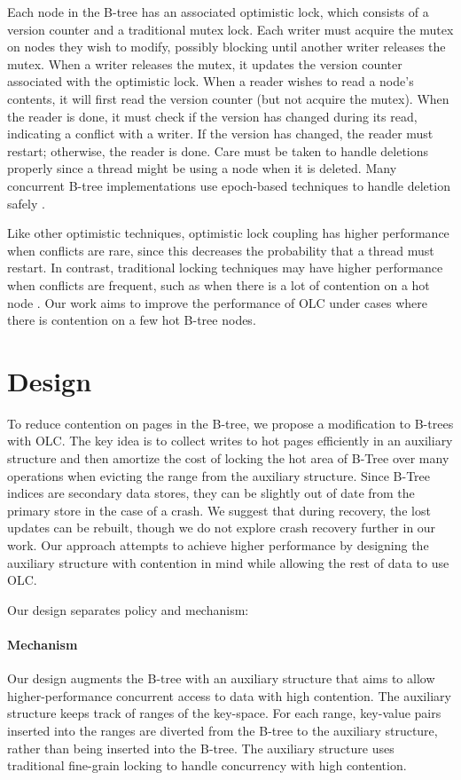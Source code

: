 \documentclass[twocolumn]{article}
\begin{document}
Each node in the B-tree has an associated optimistic lock, which consists of a
version counter and a traditional mutex lock. Each writer must acquire the
mutex on nodes they wish to modify, possibly blocking until another writer
releases the mutex. When a writer releases the mutex, it updates the version
counter associated with the optimistic lock. When a reader wishes to read a
node’s contents, it will first read the version counter (but not acquire the
mutex). When the reader is done, it must check if the version has changed
during its read, indicating a conflict with a writer. If the version has
changed, the reader must restart; otherwise, the reader is done. Care must be
taken to handle deletions properly since a thread might be using a node when it
is deleted. Many concurrent B-tree implementations use epoch-based techniques
to handle deletion safely \cite{bwtree, art}.

Like other optimistic techniques, optimistic lock coupling has higher
performance when conflicts are rare, since this decreases the probability that
a thread must restart. In contrast, traditional locking techniques may have
higher performance when conflicts are frequent, such as when there is a lot of
contention on a hot node \cite{occ}. Our work aims to improve the performance of OLC
under cases where there is contention on a few hot B-tree nodes.

\section{Design}

To reduce contention on pages in the B-tree, we propose a modification to
B-trees with OLC. The key idea is to collect writes to hot pages efficiently in
an auxiliary structure and then amortize the cost of locking the hot area of
B-Tree over many operations when evicting the range from the auxiliary
structure. Since B-Tree indices are secondary data stores, they can be slightly
out of date from the primary store in the case of a crash. We suggest that
during recovery, the lost updates can be rebuilt, though we do not explore
crash recovery further in our work. Our approach attempts to achieve higher
performance by designing the auxiliary structure with contention in mind while
allowing the rest of data to use OLC.

Our design separates policy and mechanism:

\paragraph{Mechanism} Our design augments the B-tree with an auxiliary
structure that aims to allow higher-performance concurrent access to data with
high contention. The auxiliary structure keeps track of ranges of the
key-space. For each range, key-value pairs inserted into the ranges are
diverted from the B-tree to the auxiliary structure, rather than being inserted
into the B-tree. The auxiliary structure uses traditional fine-grain locking to
handle concurrency with high contention.
\end{document}
